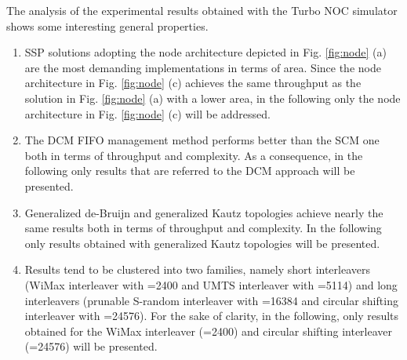 \documentclass[10pt,twocolumn,journal]{IEEEtran}
\begin{document}
The analysis of the experimental results obtained with the Turbo NOC simulator shows some interesting general properties. 
\begin{enumerate}
\item SSP solutions adopting the node architecture depicted in Fig. \ref{fig:node} (a) 
are the most demanding implementations in terms of area. Since the node architecture in Fig. \ref{fig:node} (c) achieves 
the same throughput as the solution in Fig. \ref{fig:node} (a) with a lower area, in the following only the node 
architecture in Fig. \ref{fig:node} (c) will be addressed.
\item The DCM FIFO management method performs better than the SCM one both in terms of throughput and complexity. 
As a consequence, in the following only results that are referred to the DCM approach will be presented.
\item Generalized de-Bruijn and generalized Kautz topologies achieve nearly the same results 
both in terms of throughput and complexity. In the following only results obtained with generalized Kautz topologies will 
be presented.
\item Results tend to be clustered into two families, namely short interleavers (WiMax interleaver with =2400 and UMTS interleaver with 
=5114) and long interleavers (prunable S-random interleaver with =16384 and circular shifting interleaver 
with =24576). For the sake of clarity, in the following, only results obtained for the WiMax interleaver (=2400) and 
circular shifting interleaver (=24576) will be presented.
\end{enumerate}
\end{document}

